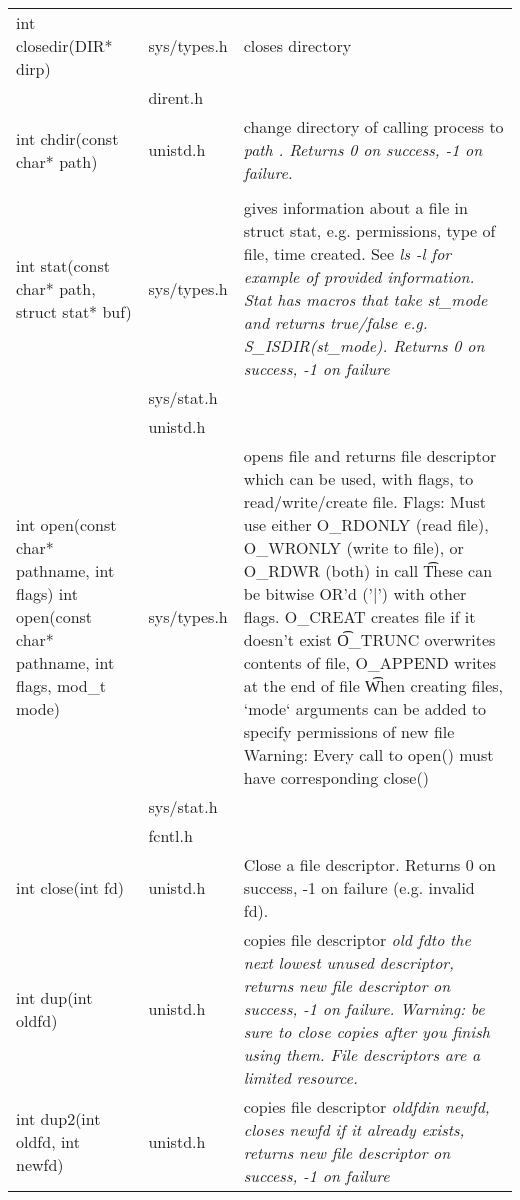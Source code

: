 \documentclass{article}
\begin{document}
\begin{longtabu}{l p{1in} p{4in}}
    \\ \hline
    int closedir(DIR* dirp) & sys/types.h & closes  directory
    \\
    & dirent.h & %
    \\  \hline
    int chdir(const char* path) & unistd.h & change directory of calling process to \it path \rm . Returns 0 on success, -1 on failure.
    \\
    \\ \hline
    int stat(const char* path,  struct stat* buf) & sys/types.h & gives information about a file in struct stat, e.g. permissions, type of file, time created. See \it ls -l \rm for example of provided information. Stat has macros that take st_mode and returns true/false e.g. S_ISDIR(st_mode). Returns 0 on success, -1 on failure
    \\
    & sys/stat.h & 
    \\
    & unistd.h & 
    \\ \hline
    int open(const char* pathname, int flags) int open(const char* pathname, int flags, mod\_t mode) & sys/types.h & opens file and returns file descriptor which can be used, with flags, to read/write/create file. Flags: Must use either O_RDONLY (read file), O_WRONLY (write to file), or O_RDWR (both) in call
\t These can be bitwise OR'd ('|') with other flags. O_CREAT creates file if it doesn't exist
\t O_TRUNC overwrites contents of file, O_APPEND writes at the end of file
\t When creating files, `mode` arguments can be added to specify permissions of new file
Warning: Every call to open() must have corresponding close()
    \\
    & sys/stat.h & 
    \\
    \ \ \ \ \ \ \ \ \ \ & fcntl.h & 
    \\ \hline
    int close(int fd) & unistd.h & Close a file descriptor. Returns 0 on success, -1 on failure (e.g. invalid fd).
    \\ \hline
    int dup(int oldfd) & unistd.h & copies file descriptor \it old fd\rm to the next lowest unused descriptor, returns new file descriptor on success, -1 on failure. Warning: be sure to close copies after you finish using them. File descriptors are a limited resource.
    \\ \hline
    int dup2(int oldfd, int newfd) & unistd.h & copies file descriptor \it oldfd\rm in newfd, closes newfd if it already exists, returns new file descriptor on success, -1 on failure

\end{longtabu}
\end{document}
